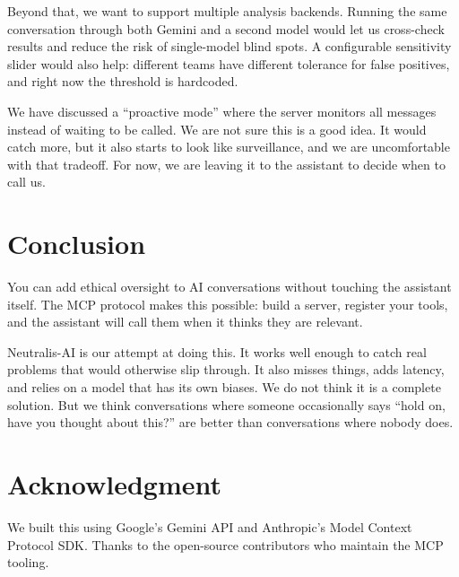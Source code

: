 \documentclass[conference]{IEEEtran}
\begin{document}
Beyond that, we want to support multiple analysis backends. Running the same conversation through both Gemini and a second model would let us cross-check results and reduce the risk of single-model blind spots. A configurable sensitivity slider would also help: different teams have different tolerance for false positives, and right now the threshold is hardcoded.

We have discussed a ``proactive mode'' where the server monitors all messages instead of waiting to be called. We are not sure this is a good idea. It would catch more, but it also starts to look like surveillance, and we are uncomfortable with that tradeoff. For now, we are leaving it to the assistant to decide when to call us.

\section{Conclusion}

You can add ethical oversight to AI conversations without touching the assistant itself. The MCP protocol makes this possible: build a server, register your tools, and the assistant will call them when it thinks they are relevant.

Neutralis-AI is our attempt at doing this. It works well enough to catch real problems that would otherwise slip through. It also misses things, adds latency, and relies on a model that has its own biases. We do not think it is a complete solution. But we think conversations where someone occasionally says ``hold on, have you thought about this?'' are better than conversations where nobody does.

\section*{Acknowledgment}

We built this using Google's Gemini API and Anthropic's Model Context Protocol SDK. Thanks to the open-source contributors who maintain the MCP tooling.
\end{document}
